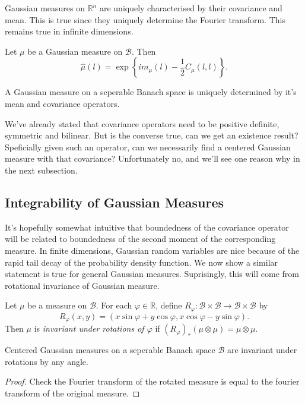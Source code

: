 \documentclass[fontsize=12pt, DIV=10]{scrreprt}
\theoremstyle{remark}
\newcommand{\R}{\mathbb R}
\newcommand{\calB}{\mathcal B}
\renewcommand{\phi}{\varphi}
\begin{document}
Gaussian measures on $\R^n$ are uniquely characterised by their covariance and mean. This is true since they uniquely determine the Fourier transform. This remains true in infinite dimensions.
\begin{prop}
	Let $\mu$ be a Gaussian measure on $\calB$. Then
	\begin{equation}
		\hat{\mu}(l) = \exp\left\{i m_{\mu}(l) - \frac{1}{2} C_{\mu}(l, l) \right\}.
	\end{equation}
\end{prop}
\begin{corollary}
	A Gaussian measure on a seperable Banach space is uniquely determined by it's mean and covariance operators.
\end{corollary}
We've already stated that covariance operators need to be positive definite, symmetric and bilinear. But is the converse true, can we get an existence result? Speficially given such an operator, can we necessarily find a centered Gaussian measure with that covariance? Unfortunately no, and we'll see one reason why in the next subsection.

\subsection{Integrability of Gaussian Measures}

It's hopefully somewhat intuitive that boundedness of the covariance operator will be related to boundedness of the second moment of the corresponding measure. In finite dimensions, Gaussian random variables are nice because of the rapid tail decay of the probability density function. We now show a similar statement is true for general Gaussian measures. Suprisingly, this will come from rotational invariance of Gaussian measure. 

\begin{defn}
	Let $\mu$ be a measure on $\calB$. For each $\phi \in \R$, define $R_{\phi}: \calB \times \calB \to \calB \times \calB$ by
	\begin{equation}
		R_{\phi}(x, y) = (x \sin \phi + y \cos \phi, x \cos \phi - y \sin \phi).
	\end{equation}
	Then $\mu$ is \emph{invariant under rotations of $\phi$} if $(R_{\phi})_* (\mu \otimes \mu) = \mu \otimes \mu$.
\end{defn}

\begin{prop}
	Centered Gaussian measures on a seperable Banach space $\calB$ are invariant under rotations by any angle.
\end{prop}
\begin{proof}
	Check the Fourier transform of the rotated measure is equal to the fourier transform of the original measure.
\end{proof}
\end{document}
